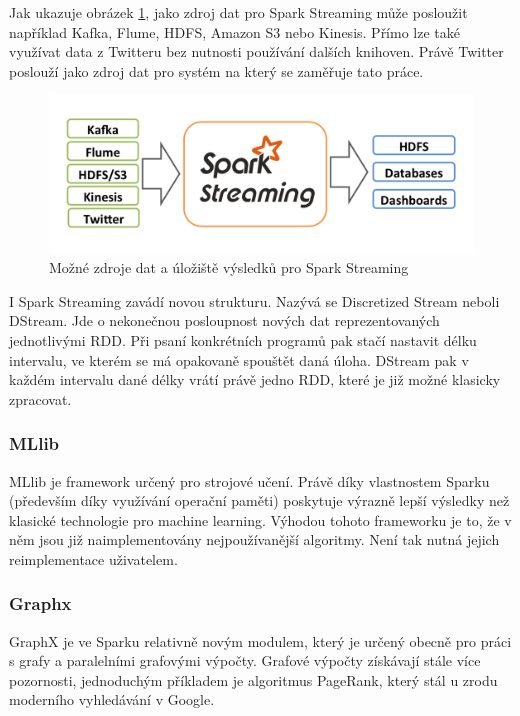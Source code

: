 \documentclass[thesis=B,czech]{FITthesis}[2012/06/26]
\begin{document}
	Jak ukazuje obrázek \ref{fig:spark_streaming_arch}, jako zdroj dat pro Spark Streaming může posloužit například Kafka, Flume, HDFS, Amazon S3 nebo Kinesis. Přímo lze také využívat data z Twitteru bez nutnosti používání dalších knihoven. Právě Twitter poslouží jako zdroj dat pro systém na který se zaměřuje tato práce.  

	\begin{figure}[ht]
    	\centering
    	\includegraphics[width=1\textwidth]{images/spark-streaming-arch.png}
    	\caption{Možné zdroje dat a úložiště výsledků pro Spark Streaming\cite{streaming-guide}}
    	\label{fig:spark_streaming_arch}
	\end{figure}
	
	I Spark Streaming zavádí novou strukturu. Nazývá se Discretized Stream neboli DStream. Jde o nekonečnou posloupnost nových dat reprezentovaných jednotlivými RDD. Při psaní konkrétních programů pak stačí nastavit délku intervalu, ve kterém se má opakovaně spouštět daná úloha. DStream pak v každém intervalu dané délky vrátí právě jedno RDD, které je již možné klasicky zpracovat. 
	

\subsubsection{MLlib}
	MLlib je framework určený pro strojové učení. Právě díky vlastnostem Sparku (především díky využívání operační paměti) poskytuje výrazně lepší výsledky než klasické technologie pro machine learning. Výhodou tohoto frameworku je to, že v něm jsou již naimplementovány nejpoužívanější algoritmy. Není tak nutná jejich reimplementace uživatelem. 

	
\subsubsection{Graphx}
	GraphX je ve Sparku relativně novým modulem, který je určený obecně pro práci s grafy a paralelními grafovými výpočty. Grafové výpočty získávají stále více pozornosti, jednoduchým příkladem je algoritmus PageRank, který stál u zrodu moderního vyhledávání v Google\cite{google-pagerank}. 
	
\end{document}
